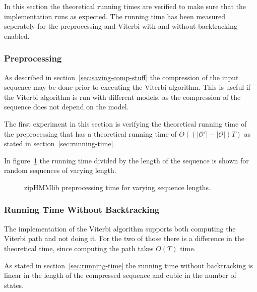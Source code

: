 In this section the theoretical running times are verified to make sure that
the implementation runs as expected. The running time has been measured
seperately for the preprocessing and Viterbi with and without backtracking
enabled.

\subsubsection{Preprocessing}

As described in section~\ref{sec:saving-comp-stuff} the compression of the
input sequence may be done prior to executing the Viterbi algorithm. This is
useful if the Viterbi algorithm is run with different models, as the
compression of the sequence does not depend on the model.

The first experiment in this section is verifying the theoretical running time
of the preprocessing that has a theoretical running time of
$O( \left( \lvert\mathcal{O'}\rvert - \lvert{\mathcal{O}}\rvert \right) T)$ as
stated in section~\ref{sec:running-time}.

In figure~\ref{fig:pre_viterbi_n} the running time divided by the length of the
sequence is shown for random sequences of varying length. 

\begin{figure}
  \centering
  
  \caption{zipHMMlib preprocessing time for varying sequence lengths.}
  \label{fig:pre_viterbi_n}
\end{figure}

%   

\subsubsection{Running Time Without Backtracking}

The implementation of the Viterbi algorithm supports both computing the Viterbi
path and not doing it. For the two of those there is a difference in the
theoretical time, since computing the path takes $O(T)$ time.

As stated in section~\ref{sec:running-time} the running time without
backtracking is linear in the length of the compressed sequence and cubic in
the number of states.

